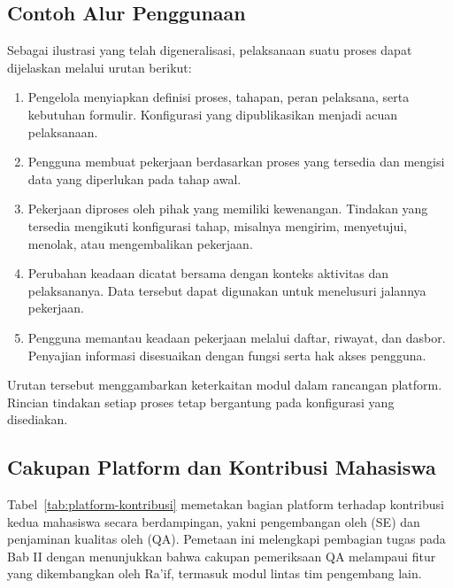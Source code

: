 \subsection{Contoh Alur Penggunaan}
Sebagai ilustrasi yang telah digeneralisasi, pelaksanaan suatu proses dapat dijelaskan melalui urutan berikut:
\begin{enumerate}[label=\arabic*)]
\item Pengelola menyiapkan definisi proses, tahapan, peran pelaksana, serta kebutuhan formulir. Konfigurasi yang dipublikasikan menjadi acuan pelaksanaan.
\item Pengguna membuat pekerjaan berdasarkan proses yang tersedia dan mengisi data yang diperlukan pada tahap awal.
\item Pekerjaan diproses oleh pihak yang memiliki kewenangan. Tindakan yang tersedia mengikuti konfigurasi tahap, misalnya mengirim, menyetujui, menolak, atau mengembalikan pekerjaan.
\item Perubahan keadaan dicatat bersama dengan konteks aktivitas dan pelaksananya. Data tersebut dapat digunakan untuk menelusuri jalannya pekerjaan.
\item Pengguna memantau keadaan pekerjaan melalui daftar, riwayat, dan dasbor. Penyajian informasi disesuaikan dengan fungsi serta hak akses pengguna.
\end{enumerate}
Urutan tersebut menggambarkan keterkaitan modul dalam rancangan platform. Rincian tindakan setiap proses tetap bergantung pada konfigurasi yang disediakan.

\subsection{Cakupan Platform dan Kontribusi Mahasiswa}
Tabel~\ref{tab:platform-kontribusi} memetakan bagian platform terhadap kontribusi kedua mahasiswa secara berdampingan, yakni pengembangan oleh \NamaRaif{} (SE) dan penjaminan kualitas oleh \NamaFrederiko{} (QA). Pemetaan ini melengkapi pembagian tugas pada Bab II dengan menunjukkan bahwa cakupan pemeriksaan QA melampaui fitur yang dikembangkan oleh Ra'if, termasuk modul lintas tim pengembang lain.

